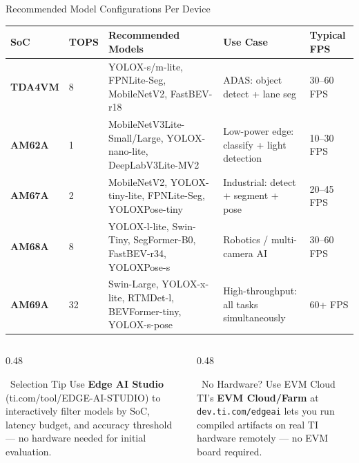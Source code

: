 \documentclass[aspectratio=169,12pt]{beamer}
\begin{document}
\begin{frame}{Recommended Model Configurations Per Device}
  \scriptsize
  \begin{tabular}{p{1.5cm}p{1.5cm}p{3.4cm}p{3.4cm}p{2.2cm}}
    \toprule
    \textbf{SoC} & \textbf{TOPS} & \textbf{Recommended Models} & \textbf{Use Case} & \textbf{Typical FPS} \\
    \midrule
    \rowcolor{TIRed!12}
    \textcolor{TIRed}{\textbf{TDA4VM}} & 8 &
      YOLOX-s/m-lite, FPNLite-Seg, MobileNetV2, FastBEV-r18 &
      ADAS: object detect + lane seg & 30--60 FPS \\[3pt]

    \rowcolor{TIBlue!10}
    \textcolor{TIBlue}{\textbf{AM62A}} & 1 &
      MobileNetV3Lite-Small/Large, YOLOX-nano-lite, DeepLabV3Lite-MV2 &
      Low-power edge: classify + light detection & 10--30 FPS \\[3pt]

    \rowcolor{TIBlue!18}
    \textcolor{TIBlue!80}{\textbf{AM67A}} & 2 &
      MobileNetV2, YOLOX-tiny-lite, FPNLite-Seg, YOLOXPose-tiny &
      Industrial: detect + segment + pose & 20--45 FPS \\[3pt]

    \rowcolor{TIGreen!12}
    \textcolor{TIGreen}{\textbf{AM68A}} & 8 &
      YOLOX-l-lite, Swin-Tiny, SegFormer-B0, FastBEV-r34, YOLOXPose-s &
      Robotics / multi-camera AI & 30--60 FPS \\[3pt]

    \rowcolor{TIOrange!12}
    \textcolor{TIOrange}{\textbf{AM69A}} & 32 &
      Swin-Large, YOLOX-x-lite, RTMDet-l, BEVFormer-tiny, YOLOX-s-pose &
      High-throughput: all tasks simultaneously & 60+ FPS \\
    \bottomrule
  \end{tabular}

  \vspace{0.25cm}
  \begin{columns}[T]
    \begin{column}{0.48\textwidth}
      \begin{alertblock}{\scriptsize \faLightbulb~Selection Tip}
        \scriptsize Use \textbf{Edge AI Studio} (ti.com/tool/EDGE-AI-STUDIO)
        to interactively filter models by SoC, latency budget, and accuracy
        threshold --- no hardware needed for initial evaluation.
      \end{alertblock}
    \end{column}
    \begin{column}{0.48\textwidth}
      \begin{exampleblock}{\scriptsize \faCloud~No Hardware? Use EVM Cloud}
        \scriptsize TI's \textbf{EVM Cloud/Farm} at \texttt{dev.ti.com/edgeai}
        lets you run compiled artifacts on real TI hardware remotely
        --- no EVM board required.
      \end{exampleblock}
    \end{column}
  \end{columns}
\end{frame}
\end{document}
